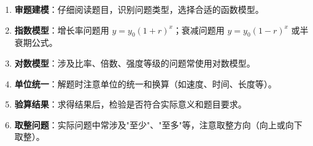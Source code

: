 \documentclass[11pt]{ctexrep}
\begin{document}
\begin{enumerate}
    \item \textbf{审题建模}：仔细阅读题目，识别问题类型，选择合适的函数模型。
    \item \textbf{指数模型}：增长率问题用 $y = y_0(1+r)^x$；衰减问题用 $y = y_0(1-r)^x$ 或半衰期公式。
    \item \textbf{对数模型}：涉及比率、倍数、强度等级的问题常使用对数模型。
    \item \textbf{单位统一}：解题时注意单位的统一和换算（如速度、时间、长度等）。
    \item \textbf{验算结果}：求得结果后，检验是否符合实际意义和题目要求。
    \item \textbf{取整问题}：实际问题中常涉及"至少"、"至多"等，注意取整方向（向上或向下取整）。
\end{enumerate}
\end{document}

